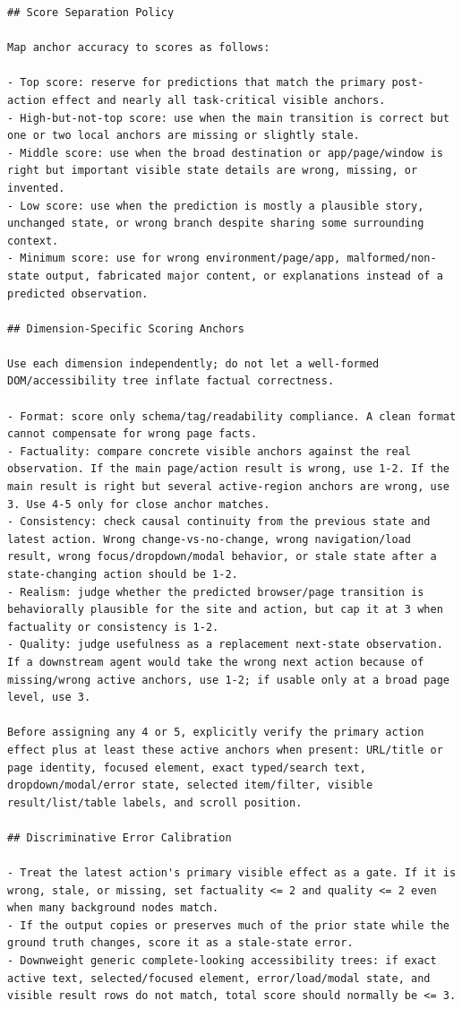 \documentclass{llmxive}
\begin{document}
\begin{lstlisting}
## Score Separation Policy

Map anchor accuracy to scores as follows:

- Top score: reserve for predictions that match the primary post-action effect and nearly all task-critical visible anchors.
- High-but-not-top score: use when the main transition is correct but one or two local anchors are missing or slightly stale.
- Middle score: use when the broad destination or app/page/window is right but important visible state details are wrong, missing, or invented.
- Low score: use when the prediction is mostly a plausible story, unchanged state, or wrong branch despite sharing some surrounding context.
- Minimum score: use for wrong environment/page/app, malformed/non-state output, fabricated major content, or explanations instead of a predicted observation.

## Dimension-Specific Scoring Anchors

Use each dimension independently; do not let a well-formed DOM/accessibility tree inflate factual correctness.

- Format: score only schema/tag/readability compliance. A clean format cannot compensate for wrong page facts.
- Factuality: compare concrete visible anchors against the real observation. If the main page/action result is wrong, use 1-2. If the main result is right but several active-region anchors are wrong, use 3. Use 4-5 only for close anchor matches.
- Consistency: check causal continuity from the previous state and latest action. Wrong change-vs-no-change, wrong navigation/load result, wrong focus/dropdown/modal behavior, or stale state after a state-changing action should be 1-2.
- Realism: judge whether the predicted browser/page transition is behaviorally plausible for the site and action, but cap it at 3 when factuality or consistency is 1-2.
- Quality: judge usefulness as a replacement next-state observation. If a downstream agent would take the wrong next action because of missing/wrong active anchors, use 1-2; if usable only at a broad page level, use 3.

Before assigning any 4 or 5, explicitly verify the primary action effect plus at least these active anchors when present: URL/title or page identity, focused element, exact typed/search text, dropdown/modal/error state, selected item/filter, visible result/list/table labels, and scroll position.

## Discriminative Error Calibration

- Treat the latest action's primary visible effect as a gate. If it is wrong, stale, or missing, set factuality <= 2 and quality <= 2 even when many background nodes match.
- If the output copies or preserves much of the prior state while the ground truth changes, score it as a stale-state error.
- Downweight generic complete-looking accessibility trees: if exact active text, selected/focused element, error/load/modal state, and visible result rows do not match, total score should normally be <= 3.
\end{lstlisting}
\end{document}
